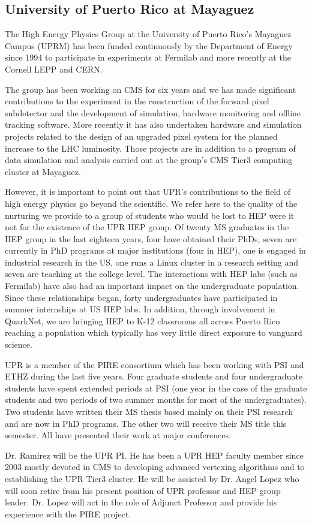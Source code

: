 
\subsection{University of Puerto Rico at Mayaguez}

The High Energy Physics Group at the University of Puerto Rico's
Mayaguez Campus (UPRM) has been funded continuously by the Department
of Energy since 1994 to participate in experiments at Fermilab and
more recently at the Cornell LEPP and CERN.

The group has been working on CMS for six years and we has made
significant contributions to the experiment in the construction of the
forward pixel subdetector and the development of simulation, hardware
monitoring and offline tracking software.  More recently it has also
undertaken hardware and simulation projects related to the design of
an upgraded pixel system for the planned increase to the LHC
luminosity.  Those projects are in addition to a program of data
simulation and analysis carried out at the group's CMS Tier3 computing
cluster at Mayaguez.

However, it is important to point out that UPR's contributions to the
field of high energy physics go beyond the scientific. We refer here
to the quality of the nurturing we provide to a group of students who
would be lost to HEP were it not for the existence of the UPR HEP
group.  Of twenty MS graduates in the HEP group in the last eighteen
years, four have obtained their PhDs, seven are currently in PhD
programs at major institutions (four in HEP), one is engaged in
industrial research in the US, one runs a Linux cluster in a research
setting and seven are teaching at the college level.  The interactions
with HEP labs (such as Fermilab) have also had an important impact on
the undergraduate population.  Since these relationships began, forty
undergraduates have participated in summer internships at US HEP labs.
In addition, through involvement in QuarkNet, we are bringing HEP to
K-12 classrooms all across Puerto Rico reaching a population which
typically has very little direct exposure to vanguard science.

UPR is a member of the PIRE consortium which has been working with PSI
and ETHZ during the last five years.  Four graduate students and four
undergraduate students have spent extended periods at PSI (one year in
the case of the graduate students and two periods of two summer months
for most of the undergraduates).  Two students have written their MS
thesis based mainly on their PSI research and are now in PhD programs.
The other two will receive their MS title this semester.  All have
presented their work at major conferences.

Dr. Ramirez will be the UPR PI. He has been a UPR HEP faculty member
since 2003 mostly devoted in CMS to developing advanced vertexing
algorithms and to establishing the UPR Tier3 cluster.  He will be
assisted by Dr. Angel Lopez who will soon retire from his present
position of UPR professor and HEP group leader.  Dr. Lopez will act in
the role of Adjunct Professor and provide his experience with the PIRE
project.


